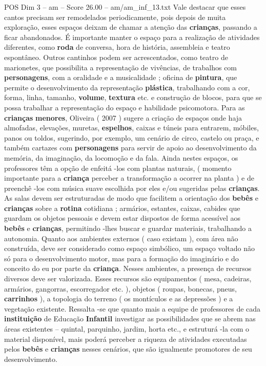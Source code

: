 \begin{textsample}{POS Dim 3 – am – Score 26.00 – am/am\_inf\_13.txt}
Vale destacar que esses cantos precisam ser remodelados periodicamente, pois depois de muita exploração, esses espaços deixam de chamar a atenção das \textbf{crianças}, passando a ficar abandonados.
É importante manter o espaço para a realização de atividades diferentes, como \textbf{roda} de conversa, hora de história, assembleia e teatro espontâneo.
Outros cantinhos podem ser acrescentados, como teatro de marionetes, que possibilita a representação de vivências, de trabalhos com \textbf{personagens}, com a oralidade e a musicalidade ; oficina de \textbf{pintura}, que permite o desenvolvimento da representação \textbf{plástica}, trabalhando com a cor, forma, linha, tamanho, \textbf{volume}, \textbf{textura} etc. e construção de blocos, para que se possa trabalhar a representação do espaço e habilidade psicomotora.
Para as \textbf{crianças} \textbf{menores}, Oliveira ( 2007 ) sugere a criação de espaços onde haja almofadas, elevações, muretas, \textbf{espelhos}, caixas e túneis para entrarem, móbiles, panos ou toldos, sugerindo, por exemplo, um cenário de circo, castelo ou praça, e também cartazes com \textbf{personagens} para servir de apoio ao desenvolvimento da memória, da imaginação, da locomoção e da fala.
Ainda nestes espaços, os professores têm a opção de enfeitá -los com plantas naturais, ( momento importante para a \textbf{criança} perceber a transformação a ocorrer na planta ) e de preenchê -los com música suave escolhida por eles e/ou sugeridas pelas \textbf{crianças}.
As salas devem ser estruturadas de modo que facilitem a orientação dos \textbf{bebês} e \textbf{crianças} sobre a \textbf{rotina} cotidiana ; armários, estantes, caixas, cabides que guardam os objetos pessoais e devem estar dispostos de forma acessível aos \textbf{bebês} e \textbf{crianças}, permitindo -lhes buscar e guardar materiais, trabalhando a autonomia.
Quanto aos ambientes externos ( caso existam ), com área não construída, deve ser considerado como espaço simbólico, um espaço voltado não só para o desenvolvimento motor, mas para a formação do imaginário e do conceito do eu por parte da \textbf{criança}.
Nesses ambientes, a presença de recursos diversos deve ser valorizada.
Esses recursos são equipamentos ( mesa, cadeiras, armários, gangorras, escorregador etc. ), objetos ( roupas, bonecas, pneus, \textbf{carrinhos} ), a topologia do terreno ( os montículos e as depressões ) e a vegetação existente.
Ressalta -se que quanto mais a equipe de professores de cada \textbf{instituição} de Educação \textbf{Infantil} investigar as possibilidades que se abrem nas áreas existentes – quintal, parquinho, jardim, horta etc., e estruturá -la com o material disponível, mais poderá perceber a riqueza de atividades executadas pelos \textbf{bebês} e \textbf{crianças} nesses cenários, que são igualmente promotores de seu desenvolvimento.

\end{textsample}

